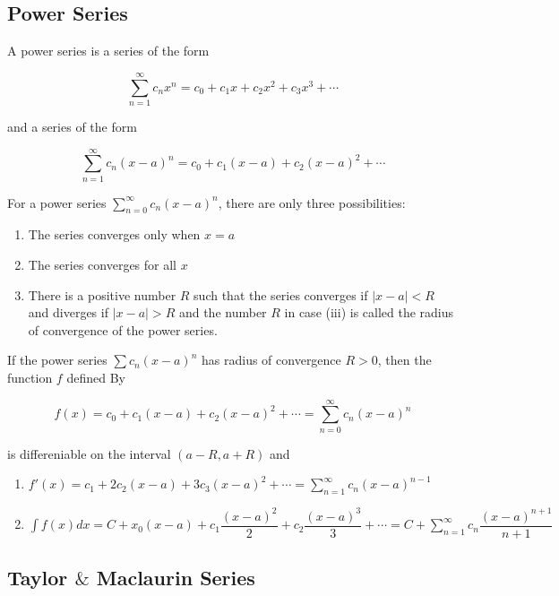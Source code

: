 \subsection{Power Series}


\begin{defn}
	A power series is a series of the form
	
	$$\sum^{\infty}_{n = 1} c_n x^n = c_0 + c_1x+c_2x^2 + c_3x^3+ \cdots$$
	
	and a series of the form
	
	$$\sum^{\infty}_{n = 1}c_n(x-a)^n = c_0 + c_1(x - a)+c_2(x-a)^2+\cdots$$	
\end{defn}

\begin{thm*}
	For a power series $\sum^{\infty}_{n = 0}c_n(x - a)^n$, there are only three possibilities:
	
	\begin{enumerate}[wide,label = ($\roman*$)]
		\item The series converges only when $x=a$
		\item The series converges for all $x$
		\item There is a positive number $R$ such that the series converges if $|x-a| < R$ and diverges if $|x-a| > R$ and the number $R$ in case (iii) is called the radius of convergence of the power series.
	\end{enumerate}
	
\end{thm*}

\begin{thm*}
	If the power series $\sum c_n(x-a)^n$ has radius of convergence $R > 0$, then the function $f$ defined By
	
	$$f(x) = c_0 + c_1(x-a) + c_2(x-a)^2 + \cdots = \sum^{\infty}_{n=0}c_n(x-a)^n$$	
	
	is differeniable on the interval $(a-R,a+R)$ and
	
	\begin{enumerate}[label = ($\roman*$)]
		\item $f'(x) = c_1 + 2c_2(x-a)+3c_3(x-a)^2 + \cdots = \sum_{n=1}^{\infty} c_n (x-a)^{n-1}$
		\item $\int f(x)dx = C + x_0(x - a) + c_1 \dfrac{(x-a)^2}{2} + c_2 \dfrac{(x-a)^{3}}{3}+\cdots = C + \sum^{\infty}_{n=1}c_n\dfrac{(x-a)^{n+1}}{n+1}$
	\end{enumerate}

\end{thm*}

\subsection{Taylor $\&$ Maclaurin Series}

